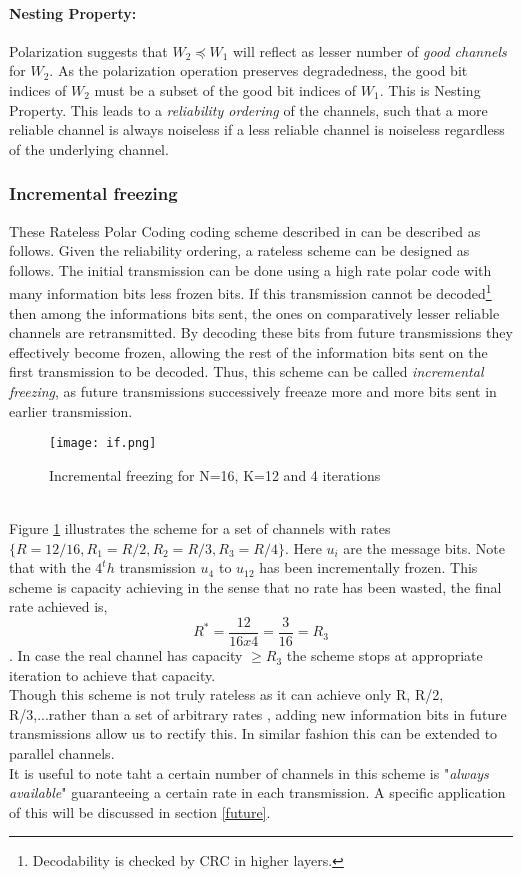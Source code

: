 \documentclass[
11pt, %
a4paper, %
oneside, %
headinclude,footinclude, %
BCOR5mm, %
]{scrartcl}
\begin{document}
\paragraph{Nesting Property:}Polarization suggests that $W_2 \preceq W_1$ will reflect as lesser number of \emph{good channels} for $W_2$. As the polarization operation preserves degradedness, the good bit indices of $W_2$ must be a subset of the good bit indices of $W_1$. This is Nesting Property. This leads to a \emph{reliability ordering} of the channels, such that a more reliable channel is always noiseless if a less reliable channel is noiseless regardless of the underlying channel.
\subsubsection{Incremental freezing}
These Rateless Polar Coding coding scheme described in \cite{chen} can be described as follows.
Given the reliability ordering, a rateless scheme can be designed as follows. The initial transmission can be done using a high rate polar code with many information bits less frozen bits. If this transmission cannot be decoded\footnote{Decodability is checked by CRC in higher layers.} then among the informations bits sent, the ones on comparatively lesser reliable channels are retransmitted. By decoding these bits from future transmissions they effectively become frozen, allowing the rest of the information bits sent on the first transmission to be decoded. Thus, this scheme can be called \emph{incremental freezing}, as future transmissions successively freeaze more and more bits sent in earlier transmission.
\begin{figure}[h]
 \begin{center}
    \texttt{[image: if.png]}
  \end{center}
  \caption{Incremental freezing for N=16, K=12 and 4 iterations}
  \label{fig:if}
\end{figure}  
\\Figure \ref{fig:if} illustrates the scheme for a set of channels with rates $\{ R=12/16, R_1= R/2,R_2= R/3,R_3= R/4\}$. Here $u_i$ are the message bits. Note that with the $4^th$ transmission  $u_4$ to $u_{12}$ has been incrementally frozen. This scheme is capacity achieving in the sense that no rate has been wasted, the final rate achieved is, $$R^*= \frac{12}{16x4}=\frac{3}{16}=R_3 $$. In case the real channel has capacity $ \geq R_3$ the scheme stops at appropriate iteration to achieve that capacity.\\
Though this scheme is not truly rateless as it can achieve only R, R/2, R/3,...rather than a set of arbitrary rates , adding new information bits in future transmissions allow us to rectify this. In similar fashion this can be extended to parallel channels.\\
It is useful to note taht a certain number of channels in this scheme is "\emph{always available}" guaranteeing a certain rate in each transmission. A specific application of this will be discussed in section \ref{future}.
\end{document}
